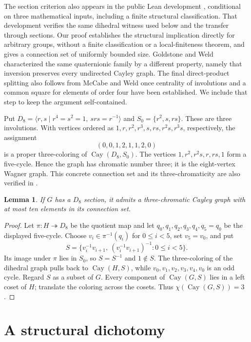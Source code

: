 \documentclass[11pt]{article}
\newtheorem{lemma}{Lemma}
\newcommand{\Cay}{\operatorname{Cay}}
\begin{document}
The section criterion also appears in the public Lean development
\cite{CayleyExpanded}, conditional on three mathematical inputs, including
a finite structural classification. That development verifies the same
dihedral witness used below and the transfer through sections. Our proof
establishes the structural implication directly for arbitrary groups,
without a finite classification or a local-finiteness theorem, and gives
a connection set of uniformly bounded size. Goldstone and Weld
\cite{GoldstoneWeld} characterized the same quaternionic family by a
different property, namely that inversion preserves every undirected
Cayley graph. The final direct-product splitting also follows from
McCabe and Weld \cite[Proposition~4.10]{McCabeWeld} once centrality of
involutions and a common square for elements of order four have been
established. We include that step to keep the argument self-contained.

Put $D_8=\langle r,s\mid r^4=s^2=1,\ srs=r^{-1}\rangle$ and
$S_0=\{r^2,s,rs\}$. These are three involutions. With vertices ordered as
$1,r,r^2,r^3,s,rs,r^2s,r^3s$, respectively, the assignment
\[
             (0,0,1,2,1,1,2,0)
\]
is a proper three-coloring of $\Cay(D_8,S_0)$. The vertices
$1,r^2,r^2s,r,rs,1$ form a five-cycle. Hence the graph has chromatic
number three; it is the eight-vertex Wagner graph. This concrete
connection set and its three-chromaticity are also verified in
\cite{CayleyExpanded}.

\begin{lemma}\label{lem:lift}
If $G$ has a $D_8$ section, it admits a three-chromatic Cayley graph with
at most ten elements in its connection set.
\end{lemma}
\begin{proof}
Let $\pi:H\twoheadrightarrow D_8$ be the quotient map and let
$q_0,q_1,q_2,q_3,q_4,q_5=q_0$ be the displayed five-cycle. Choose
$v_i\in\pi^{-1}(q_i)$ for $0\leq i<5$, set $v_5=v_0$, and put
\[
 S=\{v_i^{-1}v_{i+1},\ (v_i^{-1}v_{i+1})^{-1}:0\leq i<5\}.
\]
Its image under $\pi$ lies in $S_0$, so $S=S^{-1}$ and $1\notin S$.
The three-coloring of the dihedral graph pulls back to $\Cay(H,S)$,
while $v_0,v_1,v_2,v_3,v_4,v_0$ is an odd cycle. Regard $S$ as a subset
of $G$. Every component of $\Cay(G,S)$ lies in a left coset of $H$;
translate the coloring across the cosets. Thus $\chi(\Cay(G,S))=3$.
\end{proof}

\section{A structural dichotomy}
\end{document}
